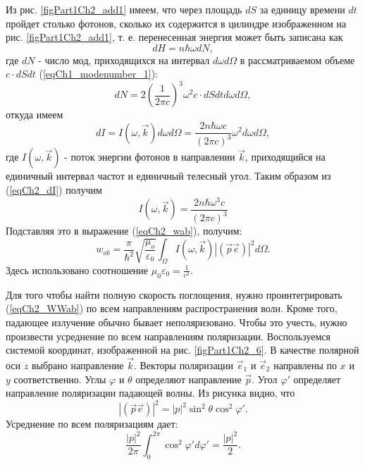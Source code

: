 Из рис. \ref{figPart1Ch2_add1} имеем, что через площадь $dS$ за единицу
времени $dt$ пройдет столько фотонов, сколько их содержится в цилиндре
изображенном на рис. \ref{figPart1Ch2_add1}, т. е. перенесенная
энергия может быть записана как
\[
dH = n \hbar \omega d N ,
\]
где $dN$ -  число мод, приходящихся на интервал $d \omega d \Omega$ в
 рассматриваемом объеме $c \cdot dS  dt$ (\ref{eqCh1_modenumber_1}):
\[
d N = 2 \left(\frac{1}{2 \pi c} \right)^3 \omega^2 
c \cdot dS  dt
d \omega d \Omega,
\]
откуда имеем 
\begin{equation}
d I = I\left(\omega, \vec{k}\right) d \omega d \Omega = 
\frac{2 n \hbar \omega c}{\left(2 \pi c\right)^3}
\omega^2 d \omega d \Omega,
\label{eqCh2_dI}
\end{equation}
где $I\left(\omega, \vec{k}\right)$ - 
поток энергии фотонов в направлении $\vec{k}$,  приходящийся на единичный
интервал частот и единичный телесный угол. Таким образом из
(\ref{eqCh2_dI}) получим 
\begin{equation}
I\left(\omega, \vec{k}\right) = 
\frac{2 n \hbar \omega^3 c}{\left(2 \pi c\right)^3}
\nonumber
\end{equation}
Подставляя это в выражение (\ref{eqCh2_wab}), получим:
\begin{equation}
w_{ab} = \frac{\pi}{\hbar^2}\sqrt{\frac{\mu_o}{\varepsilon_0}}
\int_{\Omega}I\left(\omega, \vec{k}\right)
\left|\left(\vec{p} \vec{e}\right)\right|^2
d \Omega.
\label{eqCh2_WWab}
\end{equation}
Здесь использовано соотношение $\mu_0 \varepsilon_0 = \frac{1}{c^2}$.



Для того чтобы найти полную скорость поглощения, нужно
проинтегрировать (\ref{eqCh2_WWab}) по всем направлениям
распространения волн. Кроме того, падающее излучение обычно бывает 
неполяризовано. Чтобы это учесть, нужно произвести усреднение
по всем направлениям поляризации. Воспользуемся системой
координат, изображенной на рис. \ref{figPart1Ch2_6}. В качестве полярной оси $z$
выбрано направление $\vec{k}$.  Векторы поляризации $\vec{e}_1$ и $\vec{e}_2$ направлены по $x$ и $y$ соответственно.
Углы $\varphi$ и $\theta$   определяют направление $\vec{p}$. 
Угол $\varphi'$ определяет направление поляризации падающей
волны. Из рисунка видно, что
\[
\left|\left(\vec{p} \vec{e}\right)\right|^2 = 
\left|p\right|^2 \sin^2 \theta \cos^2 \varphi'. 
\]
Усреднение по всем поляризациям дает: 
\begin{equation}
\frac{\left|p\right|^2}{2 \pi} \int_0^{2 \pi}
\cos^2 \varphi' d \varphi' = \frac{\left|p\right|^2}{2}.
\label{eqCh2_PolyarMedian}
\end{equation}

